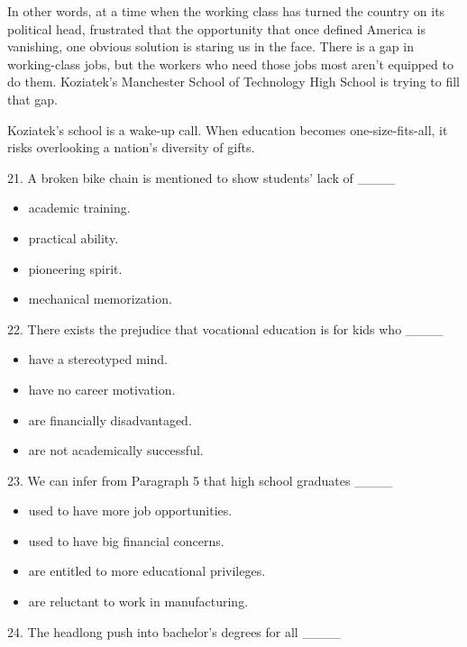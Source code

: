\documentclass[UTF8,11pt]{ctexart}
\begin{document}
In other words, at a time when the working class has turned the country on its political head, frustrated that the opportunity that once defined America is vanishing, one obvious solution is staring us in the face. There is a gap in working-class jobs, but the workers who need those jobs most aren’t equipped to do them. Koziatek’s Manchester School of Technology High School is trying to fill that gap.


Koziatek’s school is a wake-up call. When education becomes one-size-fits-all, it risks overlooking a nation’s diversity of gifts.


21. A broken bike chain is mentioned to show students’ lack of \_\_\_\_


\begin{itemize}[leftmargin=2em,itemsep=.2em,topsep=.4em]\item[A.] academic training.
\item[B.] practical ability.
\item[C.] pioneering spirit.
\item[D.] mechanical memorization.
\end{itemize}

22. There exists the prejudice that vocational education is for kids who \_\_\_\_


\begin{itemize}[leftmargin=2em,itemsep=.2em,topsep=.4em]\item[A.] have a stereotyped mind.
\item[B.] have no career motivation.
\item[C.] are financially disadvantaged.
\item[D.] are not academically successful.
\end{itemize}

23. We can infer from Paragraph 5 that high school graduates \_\_\_\_


\begin{itemize}[leftmargin=2em,itemsep=.2em,topsep=.4em]\item[A.] used to have more job opportunities.
\item[B.] used to have big financial concerns.
\item[C.] are entitled to more educational privileges.
\item[D.] are reluctant to work in manufacturing.
\end{itemize}

24. The headlong push into bachelor’s degrees for all \_\_\_\_
\end{document}
